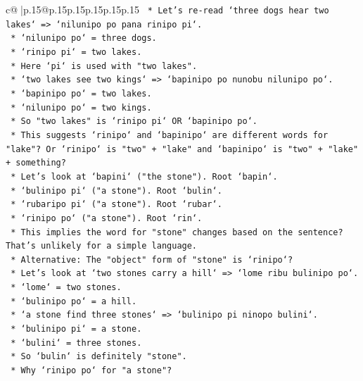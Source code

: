 \documentclass{article}
\begin{document}
{\begin{supertabular}{c@{$\;$}|p{.15\linewidth}@{}p{.15\linewidth}p{.15\linewidth}p{.15\linewidth}p{.15\linewidth}p{.15\linewidth}}
{{{\texttt{            *   Let's re{-}read `three dogs hear two lakes` => `nilunipo po pana rinipo pi`.} \\
\texttt{                *   `nilunipo po` = three dogs.} \\
\texttt{                *   `rinipo pi` = two lakes.} \\
\texttt{                *   Here `pi` is used with "two lakes".} \\
\texttt{            *   `two lakes see two kings` => `bapinipo po nunobu nilunipo po`.} \\
\texttt{                *   `bapinipo po` = two lakes.} \\
\texttt{                *   `nilunipo po` = two kings.} \\
\texttt{            *   So "two lakes" is `rinipo pi` OR `bapinipo po`.} \\
\texttt{            *   This suggests `rinipo` and `bapinipo` are different words for "lake"? Or `rinipo` is "two" + "lake" and `bapinipo` is "two" + "lake" + something?} \\
\texttt{            *   Let's look at `bapini` ("the stone"). Root `bapin`.} \\
\texttt{            *   `bulinipo pi` ("a stone"). Root `bulin`.} \\
\texttt{            *   `rubaripo pi` ("a stone"). Root `rubar`.} \\
\texttt{            *   `rinipo po` ("a stone"). Root `rin`.} \\
\texttt{            *   This implies the word for "stone" changes based on the sentence? That's unlikely for a simple language.} \\
\texttt{            *   Alternative: The "object" form of "stone" is `rinipo`?} \\
\texttt{            *   Let's look at `two stones carry a hill` => `lome ribu bulinipo po`.} \\
\texttt{                *   `lome` = two stones.} \\
\texttt{                *   `bulinipo po` = a hill.} \\
\texttt{            *   `a stone find three stones` => `bulinipo pi ninopo bulini`.} \\
\texttt{                *   `bulinipo pi` = a stone.} \\
\texttt{                *   `bulini` = three stones.} \\
\texttt{            *   So `bulin` is definitely "stone".} \\
\texttt{            *   Why `rinipo po` for "a stone"?} \\
}}}
\end{supertabular}}
\end{document}
